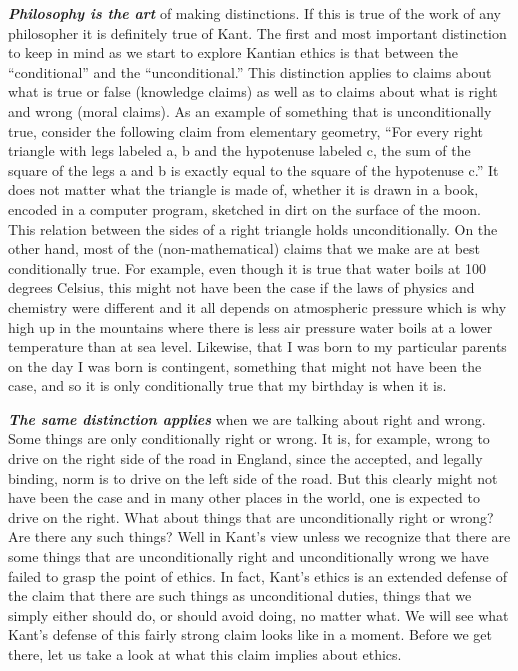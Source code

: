 \documentclass[12pt, openany]{book}
\begin{document}
\textbf{\emph{Philosophy is the art}} of making distinctions. If this is true of the work of any philosopher it is definitely true of Kant. The first and most important distinction to keep in mind as we start to explore Kantian ethics is that between the ``conditional'' and the ``unconditional.'' This distinction applies to claims about what is true or false (knowledge claims) as well as to claims about what is right and wrong (moral claims). As an example of something that is unconditionally true, consider the following claim from elementary geometry, ``For every right triangle with legs labeled a, b and the hypotenuse labeled c, the sum of the square of the legs a and b is exactly equal to the square of the hypotenuse c.'' It does not matter what the triangle is made of, whether it is drawn in a book, encoded in a computer program, sketched in dirt on the surface of the moon. This relation between the sides of a right triangle holds unconditionally. On the other hand, most of the (non-mathematical) claims that we make are at best conditionally true. For example, even though it is true that water boils at 100 degrees Celsius, this might not have been the case if the laws of physics and chemistry were different and it all depends on atmospheric pressure which is why high up in the mountains where there is less air pressure water boils at a lower temperature than at sea level. Likewise, that I was born to my particular parents on the day I was born is contingent, something that might not have been the case, and so it is only conditionally true that my birthday is when it is.

\textbf{\emph{The same distinction applies}} when we are talking about right and wrong. Some things are only conditionally right or wrong. It is, for example, wrong to drive on the right side of the road in England, since the accepted, and legally binding, norm is to drive on the left side of the road. But this clearly might not have been the case and in many other places in the world, one is expected to drive on the right. What about things that are unconditionally right or wrong? Are there any such things? Well in Kant's view unless we recognize that there are some things that are unconditionally right and unconditionally wrong we have failed to grasp the point of ethics. In fact, Kant's ethics is an extended defense of the claim that there are such things as unconditional duties, things that we simply either should do, or should avoid doing, no matter what. We will see what Kant's defense of this fairly strong claim looks like in a moment. Before we get there, let us take a look at what this claim implies about ethics.
\end{document}
